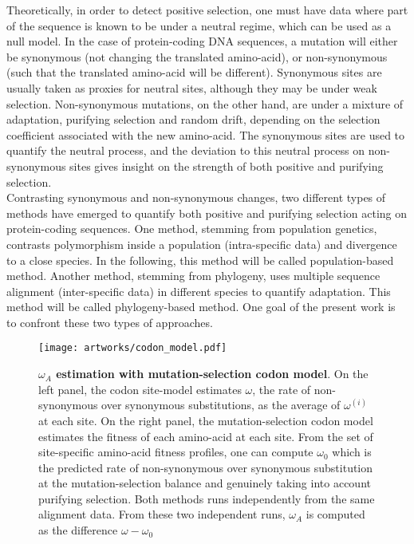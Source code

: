 \documentclass{article}
\begin{document}
	Theoretically, in order to detect positive selection, one must have data where part of the sequence is known to be under a neutral regime, which can be used as a null model. In the case of protein-coding DNA sequences, a mutation will either be synonymous (not changing the translated amino-acid), or non-synonymous (such that the translated amino-acid will be different). Synonymous sites are usually taken as proxies for neutral sites, although they may be under weak selection. Non-synonymous mutations, on the other hand, are under a mixture of adaptation, purifying selection and random drift, depending on the selection coefficient associated with the new amino-acid. The synonymous sites are used to quantify the neutral process, and the deviation to this neutral process on non-synonymous sites gives insight on the strength of both positive and purifying selection. \\
	
	Contrasting synonymous and non-synonymous changes, two different types of methods have emerged to quantify both positive and purifying selection acting on protein-coding sequences.
	One method, stemming from population genetics, contrasts polymorphism inside a population (intra-specific data) and divergence to a close species. In the following, this method will be called population-based method. Another method, stemming from phylogeny, uses multiple sequence alignment (inter-specific data) in different species to quantify adaptation. This method will be called phylogeny-based method. One goal of the present work is to confront these two types of approaches.\\
	
	\begin{figure*}[hb!]
		\centering
		\texttt{[image: artworks/codon\_model.pdf]}\\
		\caption{ \textbf{$\omega_A$ estimation with mutation-selection codon model}. On the left panel, the codon site-model estimates $\omega$, the rate of non-synonymous over synonymous substitutions, as the average of $\omega^{(i)}$ at each site. On the right panel, the mutation-selection codon model estimates the fitness of each amino-acid at each site. From the set of site-specific amino-acid fitness profiles, one can compute $\omega_{0}$ which is the predicted rate of non-synonymous over synonymous substitution at the mutation-selection balance and genuinely taking into account purifying selection. Both methods runs independently from the same alignment data. From these two independent runs, $\omega_A$ is computed as the difference $\omega - \omega_{0}$\label{fig:codon_model}}
	\end{figure*}
\end{document}
